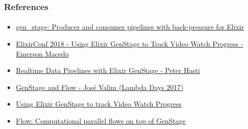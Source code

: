 \documentclass{beamer}
\begin{document}
  \begin{frame}
    \frametitle{References}
    \framesubtitle{}
    
    \begin{itemize}
    \item \href{https://github.com/elixir-lang/gen_stage}{gen\_stage: Producer and consumer pipelines with back-pressure for Elixir}
    \item \href{https://www.youtube.com/watch?v=6gcsjCl9ne0}{ElixirConf 2018 - Using Elixir GenStage to Track Video Watch Progress - Emerson Macedo}
    \item \href{https://www.youtube.com/watch?v=trpueWn8DIM}{Realtime Data Pipelines with Elixir GenStage - Peter Hasti}
    \item \href{https://www.youtube.com/watch?v=XPlXNUXmcgE}{GenStage and Flow - José Valim (Lambda Days 2017)}
    \item \href{https://blog.emerleite.com/using-elixir-genstage-to-track-video-watch-progress-9b114786c604}{Using Elixir GenStage to track Video Watch Progress}
    \item \href{https://github.com/plataformatec/flow}{Flow: Computational parallel flows on top of GenStage}
    \end{itemize}

  \end{frame}


  
\end{document}
